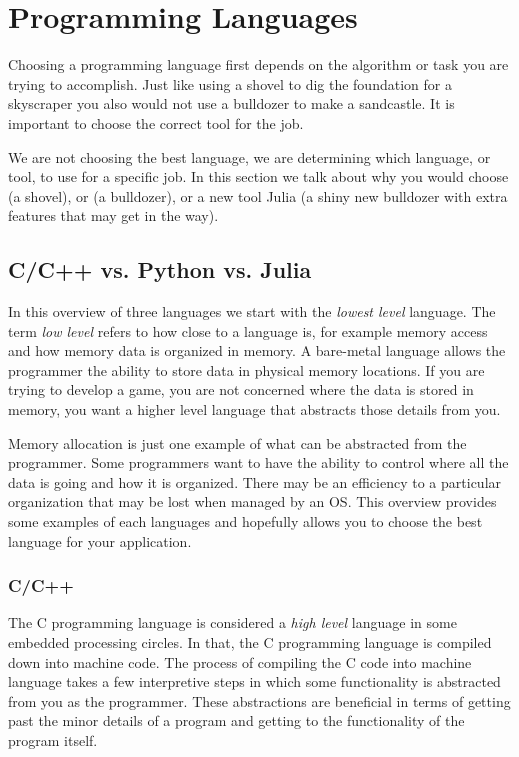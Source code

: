 \section{Programming Languages}

Choosing a programming language first depends on the algorithm or task you are trying to accomplish. Just like using a shovel to dig the foundation for a skyscraper you also would not use a bulldozer to make a sandcastle. It is important to choose the correct tool for the job. 	
	
We are not choosing the best language, we are determining which language, or tool, to use for a specific job. In this section we talk about why you would choose  (a shovel), or  (a bulldozer), or a new tool Julia (a shiny new bulldozer with extra features that may get in the way). 	
	
	
\subsection{C/C++ vs. Python vs. Julia}

In this overview of three languages we start with the \emph{lowest level} language. The term \emph{low level} refers to how close to \emph{} a language is, for example memory access and how memory data is organized in memory. A bare-metal language allows the programmer the ability to store data in physical memory locations. If you are trying to develop a game, you are not concerned where the data is stored in memory, you want a higher level language that abstracts those details from you. 

Memory allocation is just one example of what can be abstracted from the programmer. Some programmers want to have the ability to control where all the data is going and how it is organized. There may be an efficiency to a particular organization that may be lost when managed by an \ac{OS}. This overview provides some examples of each languages and hopefully allows you to choose the best language for your application.

\subsubsection{C/C++}

The C programming language is considered a \emph{high level} language in some embedded processing circles. In that, the C programming language is compiled down into machine code. The process of compiling the C code into machine language takes a few interpretive steps in which some functionality is abstracted from you as the programmer. These abstractions are beneficial in terms of getting past the minor details of a program and getting to the functionality of the program itself. 

